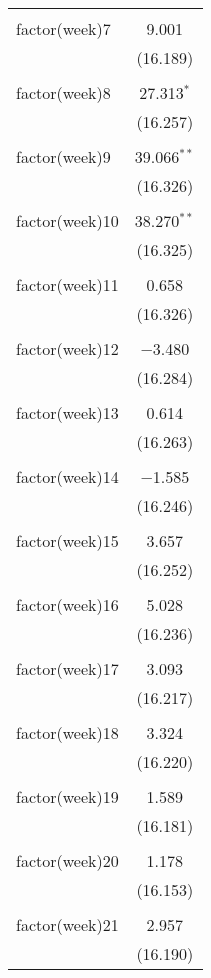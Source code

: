 \documentclass[twoside,twocolumn]{article}
\begin{document}
\begin{table}[!htbp]
\begin{tabular}{@{\extracolsep{5pt}}lc}
  & \\ 
 factor(week)7 & 9.001 \\ 
  & (16.189) \\ 
  & \\ 
 factor(week)8 & 27.313$^{*}$ \\ 
  & (16.257) \\ 
  & \\ 
 factor(week)9 & 39.066$^{**}$ \\ 
  & (16.326) \\ 
  & \\ 
 factor(week)10 & 38.270$^{**}$ \\ 
  & (16.325) \\ 
  & \\ 
 factor(week)11 & 0.658 \\ 
  & (16.326) \\ 
  & \\ 
 factor(week)12 & $-$3.480 \\ 
  & (16.284) \\ 
  & \\ 
 factor(week)13 & 0.614 \\ 
  & (16.263) \\ 
  & \\ 
 factor(week)14 & $-$1.585 \\ 
  & (16.246) \\ 
  & \\ 
 factor(week)15 & 3.657 \\ 
  & (16.252) \\ 
  & \\ 
 factor(week)16 & 5.028 \\ 
  & (16.236) \\ 
  & \\ 
 factor(week)17 & 3.093 \\ 
  & (16.217) \\ 
  & \\ 
 factor(week)18 & 3.324 \\ 
  & (16.220) \\ 
  & \\ 
 factor(week)19 & 1.589 \\ 
  & (16.181) \\ 
  & \\ 
 factor(week)20 & 1.178 \\ 
  & (16.153) \\ 
  & \\ 
 factor(week)21 & 2.957 \\ 
  & (16.190) \\ 

\end{tabular}
\end{table}
\end{document}
